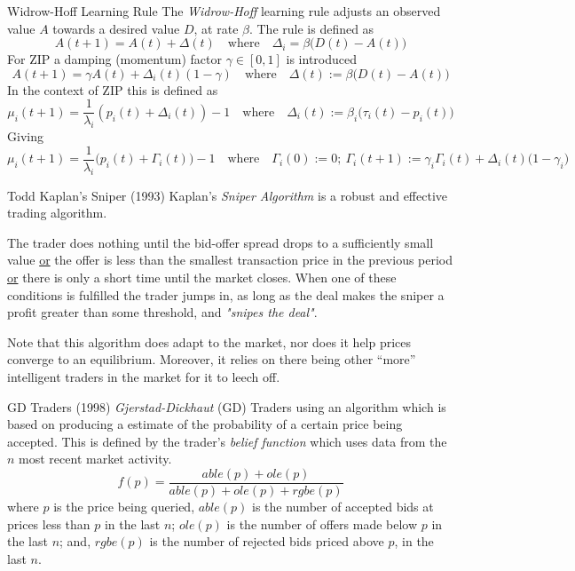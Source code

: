 \documentclass[11pt,a4paper]{article}
\begin{document}
\begin{definition}{Widrow-Hoff Learning Rule}
  The \textit{Widrow-Hoff} learning rule adjusts an observed value $A$ towards a desired value $D$, at rate $\beta$. The rule is defined as
  \[ A(t+1)=A(t)+\Delta(t)\quad\text{where}\quad\Delta_i=\beta\big(D(t)-A(t)\big) \]
  For ZIP a damping (momentum) factor $\gamma\in[0,1]$ is introduced
  \[ A(t+1)=\gamma A(t)+\Delta_i(t)(1-\gamma)\quad\text{where}\quad\Delta(t):=\beta\big(D(t)-A(t)\big) \]
  In the context of ZIP this is defined as
  \[ \mu_i(t+1)=\frac1{\lambda_i}(p_i(t)+\Delta_i(t))-1\quad\text{where}\quad\Delta_i(t):=\beta_i\big(\tau_i(t)-p_i(t)\big) \]
  Giving
  \[ \mu_i(t+1)=\frac1{\lambda_i}\big(p_i(t)+\Gamma_i(t)\big)-1\quad\text{where}\quad\Gamma_i(0):=0;\ \Gamma_i(t+1):=\gamma_i\Gamma_i(t)+\Delta_i(t)\big(1-\gamma_i\big) \]
\end{definition}

\begin{proposition}{Todd Kaplan's Sniper (1993)}
  Kaplan's \textit{Sniper Algorithm} is a robust and effective trading algorithm.
  \par The trader does nothing until the bid-offer spread drops to a sufficiently small value \underline{or} the offer is less than the smallest transaction price in the previous period \underline{or} there is only a short time until the market closes. When one of these conditions is fulfilled the trader jumps in, as long as the deal makes the sniper a profit greater than some threshold, and \textit{"snipes the deal"}.
  \par Note that this algorithm does adapt to the market, nor does it help prices converge to an equilibrium. Moreover, it relies on there being other ``more'' intelligent traders in the market for it to leech off.
\end{proposition}

\begin{proposition}{GD Traders (1998)}
  \textit{Gjerstad-Dickhaut} (GD) Traders using an algorithm which is based on producing a estimate of the probability of a certain price being accepted. This is defined by the trader's \textit{belief function} which uses data from the $n$ most recent market activity.
  \[ f(p)=\frac{able(p)+ole(p)}{able(p)+ole(p)+rgbe(p)} \]
  where $p$ is the price being queried, $able(p)$ is the number of accepted bids at prices less than $p$ in the last $n$; $ole(p)$ is the number of offers made below $p$ in the last $n$; and, $rgbe(p)$ is the number of rejected bids priced above $p$, in the last $n$.
\end{proposition}
\end{document}
